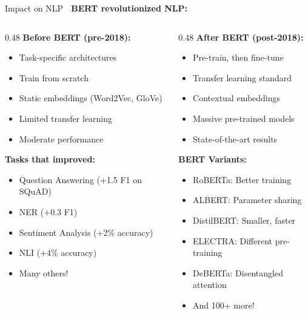 \documentclass[aspectratio=169]{beamer}
\begin{document}
\begin{frame}[shrink=10]{Impact on NLP 🌟}
\textbf{BERT revolutionized NLP:}

\vspace{1em}

\begin{columns}[T]
\begin{column}{0.48\textwidth}
\textbf{Before BERT (pre-2018):}
\begin{itemize}\setlength{\itemsep}{0pt}
    \item Task-specific architectures
    \item Train from scratch
    \item Static embeddings (Word2Vec, GloVe)
    \item Limited transfer learning
    \item Moderate performance
\end{itemize}

\vspace{1em}
\textbf{Tasks that improved:}
\begin{itemize}\setlength{\itemsep}{0pt}
    \item Question Answering (+1.5 F1 on SQuAD)
    \item NER (+0.3 F1)
    \item Sentiment Analysis (+2\% accuracy)
    \item NLI (+4\% accuracy)
    \item Many others!
\end{itemize}
\end{column}

\begin{column}{0.48\textwidth}
\textbf{After BERT (post-2018):}
\begin{itemize}\setlength{\itemsep}{0pt}
    \item Pre-train, then fine-tune
    \item Transfer learning standard
    \item Contextual embeddings
    \item Massive pre-trained models
    \item State-of-the-art results
\end{itemize}

\vspace{1em}
\textbf{BERT Variants:}
\begin{itemize}\setlength{\itemsep}{0pt}
    \item RoBERTa: Better training
    \item ALBERT: Parameter sharing
    \item DistilBERT: Smaller, faster
    \item ELECTRA: Different pre-training
    \item DeBERTa: Disentangled attention
    \item And 100+ more!
\end{itemize}
\end{column}
\end{columns}


\end{frame}
\end{document}
